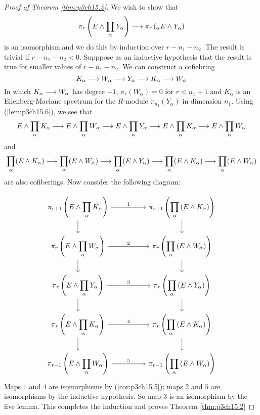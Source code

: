 \documentclass[../main]{subfiles}
\begin{document}
\begin{proof}[Proof of Theorem \ref{thm:p3ch15.2}]
We wish to show that $$\pi_r\left(E\wedge \displaystyle\prod_\alpha Y_\alpha\right)\overset{}{\longrightarrow} \pi_r\left(\displaystyle_\alpha E\wedge Y_\alpha\right)$$
is an isomorphism.and we do this by induction over $r-n_1-n_2$. The result is trivial if $r-n_1-n_2<0$. Supppose as an inductive hypothesis that the result is true for smaller values of $r-n_1-n_2$. We can construct a cofiebring $$K_\alpha\overset{}{\longrightarrow} W_\alpha \overset{}{\longrightarrow} Y_\alpha \overset{}{\longrightarrow}K_\alpha \overset{}{\longrightarrow} W_\alpha$$
In which $K_\alpha\overset{}{\longrightarrow}W_\alpha$ has degree $-1$, $\pi_r(W_\alpha)=0$ for $r<n_1+1$ and $K_\alpha$ is an Eilenberg-Maclane spectrum for the $R$-module $\pi_{n_1}(Y_\alpha)$ in dimension $n_1$. Using (\ref{lem:p3ch15.6}), we see that 
$$E\wedge \displaystyle \prod_\alpha K_\alpha\overset{}{\longrightarrow}E\wedge \displaystyle \prod_\alpha W_\alpha \overset{}{\longrightarrow} E\wedge \displaystyle \prod_\alpha Y_\alpha \overset{}{\longrightarrow}E\wedge \displaystyle \prod_\alpha K_\alpha \overset{}{\longrightarrow}E\wedge \displaystyle \prod_\alpha W_\alpha$$
and $$ \displaystyle\prod_\alpha(E\wedge K_\alpha)\overset{}{\longrightarrow}\displaystyle\prod_\alpha(E\wedge  W_\alpha) \overset{}{\longrightarrow} \displaystyle\prod_\alpha(E\wedge Y_\alpha )\overset{}{\longrightarrow}\displaystyle\prod_\alpha(E\wedge K_\alpha )\overset{}{\longrightarrow} \displaystyle\prod_\alpha(E\wedge W_\alpha)$$
are also cofiberings. Now consider the following diagram:

$$\begin{tikzcd}
	{\pi_{r+1}\left(E\wedge \displaystyle\prod_\alpha K_\alpha \right)} && {\pi_{r+1}\left(\displaystyle\prod_\alpha\left(E\wedge  K_\alpha \right)\right)} \\
	{\pi_r\left(E\wedge \displaystyle\prod_\alpha W_\alpha \right)} && {\pi_{r}\left(\displaystyle\prod_\alpha\left(E\wedge  W_\alpha \right)\right)} \\
	{\pi_{r}\left(E\wedge \displaystyle\prod_\alpha Y_\alpha \right)} && {\pi_{r}\left(\displaystyle\prod_\alpha\left(E\wedge  Y_\alpha \right)\right)} \\
	{\pi_{r}\left(E\wedge \displaystyle\prod_\alpha K_\alpha \right)} && {\pi_{r}\left(\displaystyle\prod_\alpha\left(E\wedge  K_\alpha \right)\right)} \\
	{\pi_{r-1}\left(E\wedge \displaystyle\prod_\alpha W_\alpha \right)} && {\pi_{r-1}\left(\displaystyle\prod_\alpha\left(E\wedge  W_\alpha \right)\right)}
	\arrow["1", from=1-1, to=1-3]
	\arrow["2", from=2-1, to=2-3]
	\arrow["3", from=3-1, to=3-3]
	\arrow["4", from=4-1, to=4-3]
	\arrow["5", from=5-1, to=5-3]
	\arrow[from=1-1, to=2-1]
	\arrow[from=2-1, to=3-1]
	\arrow[from=3-1, to=4-1]
	\arrow[from=4-1, to=5-1]
	\arrow[from=1-3, to=2-3]
	\arrow[from=2-3, to=3-3]
	\arrow[from=3-3, to=4-3]
	\arrow[from=4-3, to=5-3]
\end{tikzcd}$$
Maps $1$ and $4$ are isomorphisms by (\ref{cor:p3ch15.5}); maps $2$ and $5$ are isomorphisms by the inductive hypothesis. So map $3$ is an isomorphism by the five lemma. This completes the induction and proves Theorem \ref{thm:p3ch15.2}
\end{proof}
\end{document}
